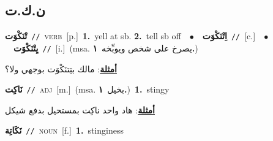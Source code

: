 \documentclass[10pt,a4paper,twoside]{article} %
\begin{document}
\begin{multicols}{2}
\vspace{-3mm}
\subsection*{\color{blue}\foreignlanguage{arabic}{ن.ك.ت}\color{blue}{}} 

{\setlength\topsep{0pt}\textbf{\foreignlanguage{arabic}{تْنَكْوَت}}\ {\color{gray}\texttt{//}\color{black}}\ \textsc{verb}\ [p.]\ \textbf{1.}~yell at sb.  \textbf{2.}~tell sb off\ \ $\bullet$\ \ \setlength\topsep{0pt}\textbf{\foreignlanguage{arabic}{اِتْنَكْوَت}}\ {\color{gray}\texttt{//}\color{black}}\ [c.]\ \ $\bullet$\ \ \setlength\topsep{0pt}\textbf{\foreignlanguage{arabic}{يِتْنَكْوَت}}\ {\color{gray}\texttt{//}\color{black}}\ [i.]\ \color{gray}(msa. \foreignlanguage{arabic}{يصرخ على شخص ويوبِّخه}~\foreignlanguage{arabic}{\textbf{١.}})\color{black}\  \begin{flushright}\color{gray}\foreignlanguage{arabic}{\textbf{\underline{\foreignlanguage{arabic}{أمثلة}}}: مالك بتِتنَكْوَت بوجهي ولا؟}\end{flushright}\color{black}} \vspace{2mm}

{\setlength\topsep{0pt}\textbf{\foreignlanguage{arabic}{نَاكِت}}\ {\color{gray}\texttt{//}\color{black}}\ \textsc{adj}\ [m.]\ \color{gray}(msa. \foreignlanguage{arabic}{بخيل}~\foreignlanguage{arabic}{\textbf{١.}})\color{black}\ \textbf{1.}~stingy\  \begin{flushright}\color{gray}\foreignlanguage{arabic}{\textbf{\underline{\foreignlanguage{arabic}{أمثلة}}}: هاد واحد ناكِت بمستحيل بدفع شيكل}\end{flushright}\color{black}} \vspace{2mm}

{\setlength\topsep{0pt}\textbf{\foreignlanguage{arabic}{نَكَاتِة}}\ {\color{gray}\texttt{//}\color{black}}\ \textsc{noun}\ [f.]\ \textbf{1.}~stinginess\ } \vspace{2mm}


\end{multicols}
\end{document}
